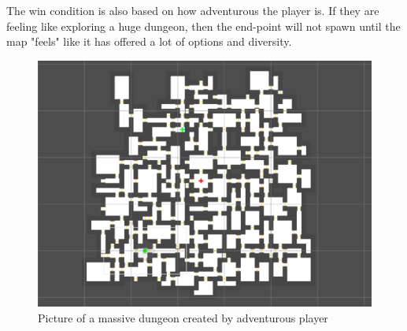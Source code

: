 \documentclass[conference,compsoc]{IEEEtran}
\begin{document}
The win condition is also based on how adventurous the player is. If they are feeling like exploring a huge dungeon, then the end-point will not spawn until the map "feels" like it has offered a lot of options and diversity.

\begin{figure}[h]
	\graphicspath{{figures/}}
	\includegraphics[width = \columnwidth ]{BigDungeon.png}
	\caption{Picture of a massive dungeon created by adventurous player}
	\label{fig:behavTree}
\end{figure}
\end{document}
